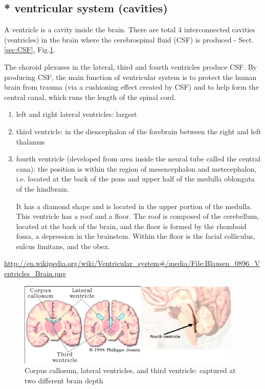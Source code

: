 \subsection{* ventricular system (cavities)}
\label{sec:ventricle_brain}

A ventricle is a cavity inside the brain. There are total 4 interconnected
cavities (ventricles) in the brain where the cerebrospinal fluid (CSF) is
produced - Sect.\ref{sec:CSF}, Fig.\ref{fig:ventricle_brain}.

The choroid plexuses in the lateral, third and fourth ventricles produce CSF.
By producing CSF, the main function of ventricular system is to protect the
human brain from trauma (via a cushioning effect created by CSF) and to help
form the central canal, which runs the length of the spinal cord.

\begin{enumerate}

  \item left and right lateral ventricles: largest

  \item third ventricle: in the diencephalon of the forebrain between the right
  and left thalamus
  
  \item fourth ventricle (developed from area inside the neural tube called the
  central cana):
  the position is within the region of mesencephalon and metecephalon, i.e.
  located at the back of the pons and upper half of the medulla oblongata of the
  hindbrain.
  
  It has a diamond shape and is located in the upper portion of the medulla.
  This ventricle has a roof and a floor. The roof is composed of the cerebellum,
   located at the back of the brain, and the floor is formed by the rhomboid
   fossa, a depression in the brainstem. 
   Within the floor is the facial colliculus, sulcus limitans, and the obex.
\end{enumerate}
\url{http://en.wikipedia.org/wiki/Ventricular_system#/media/File:Blausen_0896_Ventricles_Brain.png}

\begin{figure}[hbt]
  \centerline{ \includegraphics[height=4cm,
    angle=0]{./images/ventricle_brain.eps}}
\caption{Corpus callosum, lateral ventricles, and third ventricle: captured at
two different brain depth}
\label{fig:ventricle_brain}
\end{figure}

